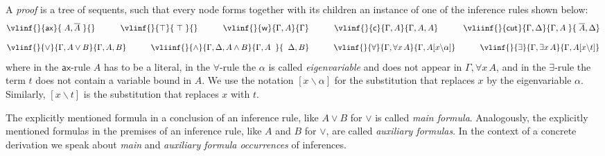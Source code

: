 \documentclass{LMCS}
\theoremstyle{plain}
\theoremstyle{definition}
\def\cutr{\mathsf{cut}}
\def\axr{\mathsf{ax}}
\def\weakr{\mathsf{weak}}
\def\conr{\mathsf{cont}}
\def\wcneg#1{\overline{#1}}
\def\qqquad{\quad\qquad}
\newcommand{\sop}{[}
\newcommand{\scl}{]}
\newcommand{\sel}[2]{#1 \backslash #2}
\newcommand{\unsubst}[2]{\sop \sel{#1}{#2} \scl}
\newcommand{\dual}[1]{\wcneg{#1}}
\def\weakr{\mathsf{w}}
\def\conr{\mathsf{c}}
\newcommand{\cutrr}[1]{\cutr_{#1}}
\begin{document}
\begin{defi}
A \emph{proof} is a tree of sequents, such that every
node forms together with its children an instance of one of the
inference rules shown below:
\begin{equation*}
\vlinf{}{\axr}{\;A,\dual{A}\;}{}
\qqquad
\vlinf{}{\top}{\;\top\;}{}
\qqquad
\vlinf{}{\weakr}{\Gamma, A}{\Gamma}
\qqquad
\vlinf{}{\conr}{\Gamma, A}{\Gamma, A, A}
\qqquad
\vliinf{}{\cutrr{}}{\Gamma,\Delta}{\Gamma, A\;}{\;\dual{A}, \Delta}
\end{equation*}
\begin{equation*}
\vlinf{}{\lor}{\Gamma, A\lor B}{\Gamma, A, B}
\qqquad
\vliinf{}{\land}{\Gamma,\Delta,A\land B}{\Gamma,A\;\;}{\;\;\Delta, B}
\qqquad
\vlinf{}{\forall}{\Gamma, \forall x\, A}{\Gamma, A\unsubst{x}{\alpha}}
\qqquad
\vlinf{}{\exists}{\Gamma, \exists x\, A}{\Gamma, A\unsubst{x}{t}}
\end{equation*}
where in the $\axr$-rule $A$ has to be a literal, in the
$\forall$-rule the $\alpha$ is called {\em eigenvariable} and does not
appear in $\Gamma,\forall x\, A$, and in the $\exists$-rule the term
$t$ does not contain a variable bound in $A$. We use the notation
$\unsubst{x}{\alpha}$ for the substitution that replaces $x$ by the
eigenvariable $\alpha$. Similarly, $\unsubst{x}{t}$ is the
substitution that replaces $x$ with $t$.
\end{defi}
The explicitly mentioned formula in a conclusion of an inference rule, like
$A\lor B$ for $\lor$ is called {\em main formula}. Analogously, the explicitly
mentioned formulas in the premises of an inference rule, like $A$ and $B$ for
$\lor$, are called {\em auxiliary formulas}. In the context of a concrete
derivation we speak about {\em main} and {\em auxiliary formula occurrences} of
inferences.
\end{document}
